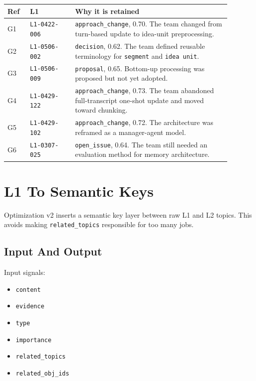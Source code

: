\documentclass[11pt,a4paper]{article}
\newcommand{\code}[1]{{\footnotesize\texttt{#1}}}
\begin{document}
\begin{longtable}{>{\raggedright\arraybackslash}p{0.09\linewidth}>{\raggedright\arraybackslash}p{0.18\linewidth}>{\raggedright\arraybackslash}p{0.62\linewidth}}
\textbf{Ref} & \textbf{L1} & \textbf{Why it is retained} \\
\hline
G1 & \code{L1-0422-006} & \code{approach\_change}, 0.70. The team changed from turn-based update to idea-unit preprocessing. \\
G2 & \code{L1-0506-002} & \code{decision}, 0.62. The team defined reusable terminology for \code{segment} and \code{idea unit}. \\
G3 & \code{L1-0506-009} & \code{proposal}, 0.65. Bottom-up processing was proposed but not yet adopted. \\
G4 & \code{L1-0429-122} & \code{approach\_change}, 0.73. The team abandoned full-transcript one-shot update and moved toward chunking. \\
G5 & \code{L1-0429-102} & \code{approach\_change}, 0.72. The architecture was reframed as a manager-agent model. \\
G6 & \code{L1-0307-025} & \code{open\_issue}, 0.64. The team still needed an evaluation method for memory architecture. \\
\end{longtable}

\section{L1 To Semantic Keys}

Optimization v2 inserts a semantic key layer between raw L1 and L2 topics. This avoids making \code{related\_topics} responsible for too many jobs.

\subsection{Input And Output}

Input signals:

\begin{itemize}
  \item \code{content}
  \item \code{evidence}
  \item \code{type}
  \item \code{importance}
  \item \code{related\_topics}
  \item \code{related\_obj\_ids}
\end{itemize}
\end{document}
